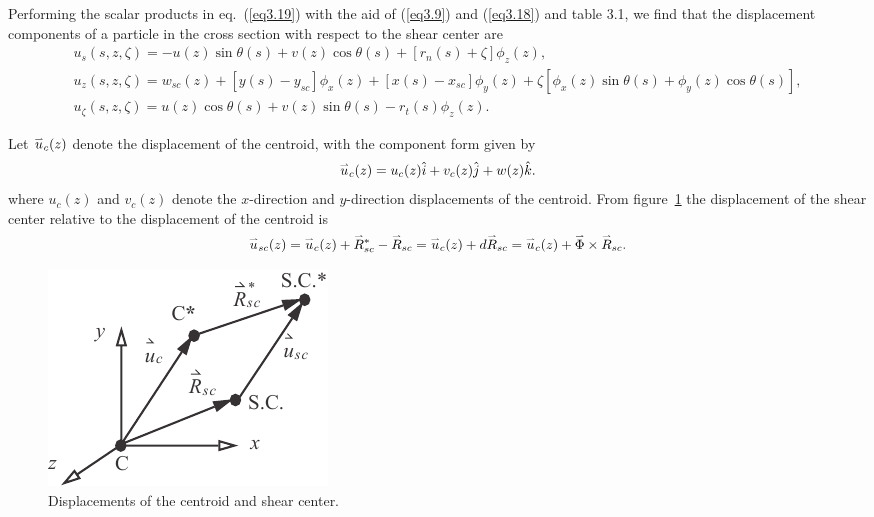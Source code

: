 \documentclass{AeroStructure-ERJohnson}
\def\harp#1{\smash{\mathord{\buildrel{\lower3pt\hbox{$\scriptscriptstyle\rightharpoonup$}}\over{#1}}}}
\begin{document}
Performing the scalar products in eq.~(\ref{eq3.19}) with the aid of (\ref{eq3.9}) and (\ref{eq3.18}) and table 3.1, we find that the displacement components of a particle in the cross section with respect to the shear center are
\begin{gather}
u_{s}(s, z, \zeta)=-u(z) \sin \theta(s)+v(z) \cos \theta(s)+\left[r_{n}(s)+\zeta\right] \phi_{z}(z),\label{eq3.20}\\
u_{z}(s, z, \zeta)=w_{s c}(z)+\left[y(s)-y_{s c}\right] \phi_{x}(z)+\left[x(s)-x_{s c}\right] \phi_{y}(z)+\zeta\left[\phi_{x}(z) \sin \theta(s)+\phi_{y}(z) \cos \theta(s)\right],\label{eq3.21}\\
u_{\zeta}(s, z, \zeta)=u(z) \cos \theta(s)+v(z) \sin \theta(s)-r_{t}(s) \phi_{z}(z).\label{eq3.22}
\end{gather}

\removelastskip

Let $\harp{u}_{c}(z)$ denote the displacement of the centroid, with the component form given by
\begin{align}\label{eq3.23}
\harp{u}_{c}(z)=u_{c}(z) \hat{i}+v_{c}(z) \hat{j}+w(z) \hat{k}.
\end{align}
where $u_{c}(z)$ and $v_{c}(z)$ denote the $x$-direction and $y$-direction displacements of the centroid. From figure~\ref{fig3.5} the displacement of the shear center relative to the displacement of the centroid is
\begin{align}\label{eq3.24}
\harp{u}_{s c}(z)=\harp{u}_{c}(z)+\harp{R}_{s c}^{*}-\harp{R}_{s c}=\harp{u}_{c}(z)+d \harp{R}_{s c}=\harp{u}_{c}(z)+\harp{\Phi} \times \harp{R}_{s c}.
\end{align}

\vspace*{-1.2pc}

\begin{figure}\vspace*{-15pt}
\includegraphics{Figure_3-5.pdf}
\caption{Displacements of the centroid and shear center.\label{fig3.5}}
\end{figure}
\end{document}
